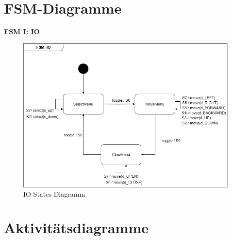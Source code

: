 










\clearpage
\section{FSM-Diagramme}

\textbf{FSM I: IO}\\
\begin{figure}[h]  
    \centering
    \includegraphics[width=0.8\linewidth]{diagrams/FSM_IO.drawio.png}
    \caption{IO States Diagramm}
    \label{fig:IO_States_Diagramm}
\end{figure}

\clearpage 
\section{Aktivitätsdiagramme}








